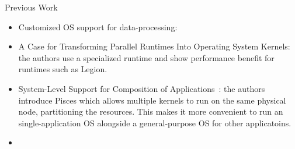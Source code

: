 \begin{block}{Previous Work}
  \begin{itemize}
      \item Customized OS support for data-processing\cite{GICEVA:2016:OS_SUPPORT}: 
      \item A Case for Transforming Parallel Runtimes Into Operating System Kernels\cite{HALE:2015:NAUTILUS}: the authors use a specialized runtime and show performance benefit for runtimes such as Legion.
      \item System-Level Support for Composition of Applications~\cite{KOCOLOSKI:2015:PISCES}: the authors introduce Pisces which allows multiple kernels to run on the same physical node, partitioning the resources. This makes it more convenient to run an single-application OS alongside a general-purpose OS for other applicatoins.
  \item {}
  \end{itemize}
  
\end{block}
